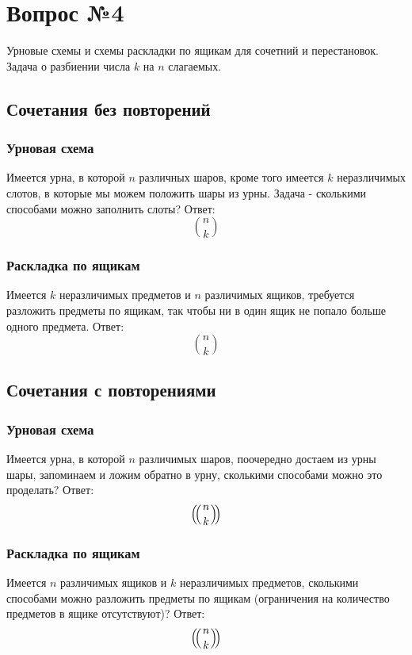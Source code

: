 \chapter{Вопрос №4}

Урновые схемы и схемы раскладки по ящикам для сочетний и перестановок. Задача о разбиении числа $k$ на $n$ слагаемых.

\section{Сочетания без повторений}

\subsection{Урновая схема}

Имеется урна, в которой $n$ различных шаров, кроме того имеется $k$ неразличимых слотов, в которые мы можем положить шары из урны. Задача - сколькими способами можно заполнить слоты? Ответ: $$ \binom{n}{k} $$

\subsection{Раскладка по ящикам}

Имеется $k$ неразличимых предметов и $n$ различимых ящиков, требуется разложить предметы по ящикам, так чтобы ни в один ящик не попало больше одного предмета. Ответ: $$ \binom{n}{k} $$

\section{Сочетания с повторениями}

\subsection{Урновая схема}

Имеется урна, в которой $n$ различимых шаров, поочередно достаем из урны шары, запоминаем и ложим обратно в урну, сколькими способами можно это проделать? Ответ: $$ \left(\negmedspace\left({{n}\atop{k}}\right)\negmedspace\right) $$

\subsection{Раскладка по ящикам}

Имеется $n$ различимых ящиков и $k$ неразличимых предметов, сколькими способами можно разложить предметы по ящикам (ограничения на количество предметов в ящике отсутствуют)? Ответ: $$ \left(\negmedspace\left({{n}\atop{k}}\right)\negmedspace\right) $$

